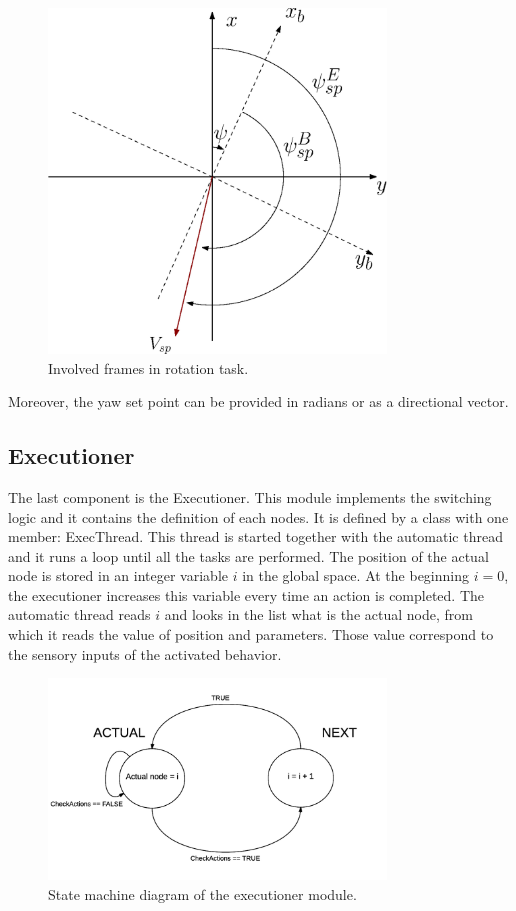 \begin{figure}[h]
\centering
 \includegraphics[width=0.8\textwidth]{rotate.eps}
 \caption{Involved frames in rotation task.}
  \label{figure:rotate}
\end{figure}
Moreover, the yaw set point can be provided in radians or  as a directional vector.


\subsection {Executioner}
\label{sec:exec}
The last component is the Executioner. This module implements the switching logic and it contains the definition of each nodes. It is defined by a class with one member: ExecThread. This thread is started together with the automatic thread and it runs a loop until all the tasks are performed. The position of the actual node is stored in an integer variable $i$ in the global space. At the beginning $i = 0$, the executioner increases this variable every time an action is completed. The automatic thread reads $i$ and looks in the list what is the actual node, from which it reads the value of position and parameters. Those value correspond to the sensory inputs of the activated behavior.

\begin{figure}[h]
\centering
 \includegraphics[width=0.8\textwidth]{executioner.png}
 \caption[Executioner sate machine.]{State machine diagram of the executioner module.}
  \label{figure:exec}
\end{figure}


